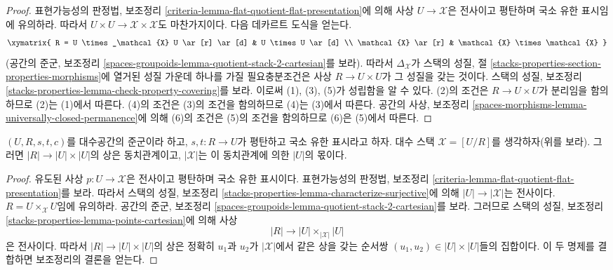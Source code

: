 \begin{proof}
표현가능성의 판정법, 보조정리
\ref{criteria-lemma-flat-quotient-flat-presentation}에 의해 사상
$U \to \mathcal{X}$은 전사이고 평탄하며 국소 유한 표시임에 유의하라.
따라서 $U \times U \to \mathcal{X} \times \mathcal{X}$도 마찬가지이다.
다음 데카르트 도식을 얻는다.
$$
\xymatrix{
R  = U \times_\mathcal{X} U \ar[r] \ar[d] & U \times U \ar[d] \\
\mathcal{X} \ar[r] & \mathcal{X} \times \mathcal{X}
}
$$
(공간의 준군, 보조정리
\ref{spaces-groupoids-lemma-quotient-stack-2-cartesian}를 보라).
따라서 $\Delta_\mathcal{X}$가 스택의 성질, 절
\ref{stacks-properties-section-properties-morphisms}에 열거된 성질 가운데
하나를 가질 필요충분조건은 사상 $R \to U \times U$가 그 성질을 갖는
것이다. 스택의 성질, 보조정리
\ref{stacks-properties-lemma-check-property-covering}를 보라.
이로써 (1), (3), (5)가 성립함을 알 수 있다.
(2)의 조건은 $R \to U \times U$가 분리임을 함의하므로 (2)는 (1)에서
따른다. (4)의 조건은 (3)의 조건을 함의하므로 (4)는 (3)에서 따른다.
공간의 사상, 보조정리
\ref{spaces-morphisms-lemma-universally-closed-permanence}에 의해 (6)의
조건은 (5)의 조건을 함의하므로 (6)은 (5)에서 따른다.
\end{proof}

\begin{lemma}
\label{lemma-points-presentation}
$(U, R, s, t, c)$를 대수공간의 준군이라 하고,
$s, t : R \to U$가 평탄하고 국소 유한 표시라고 하자.
대수 스택 $\mathcal{X} = [U/R]$를 생각하자(위를 보라).
그러면 $|R| \to |U| \times |U|$의 상은 동치관계이고,
$|\mathcal{X}|$는 이 동치관계에 의한 $|U|$의 몫이다.
\end{lemma}

\begin{proof}
유도된 사상 $p : U \to \mathcal{X}$은 전사이고 평탄하며 국소 유한
표시이다. 표현가능성의 판정법, 보조정리
\ref{criteria-lemma-flat-quotient-flat-presentation}를 보라.
따라서 스택의 성질, 보조정리
\ref{stacks-properties-lemma-characterize-surjective}에 의해
$|U| \to |\mathcal{X}|$는 전사이다.
$R = U \times_\mathcal{X} U$임에 유의하라. 공간의 준군,
보조정리 \ref{spaces-groupoids-lemma-quotient-stack-2-cartesian}를 보라.
그러므로 스택의 성질, 보조정리
\ref{stacks-properties-lemma-points-cartesian}에 의해 사상
$$
|R| \longrightarrow |U| \times_{|\mathcal{X}|} |U|
$$
은 전사이다. 따라서 $|R| \to |U| \times |U|$의 상은 정확히
$u_1$과 $u_2$가 $|\mathcal{X}|$에서 같은 상을 갖는 순서쌍
$(u_1, u_2) \in |U| \times |U|$들의 집합이다. 이 두 명제를 결합하면
보조정리의 결론을 얻는다.
\end{proof}






